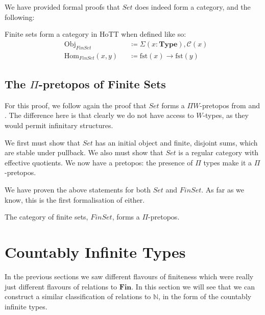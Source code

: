 We have provided formal proofs that \(\mathit{Set}\) does indeed form a
category, and the following:
\begin{theorem}
  Finite sets form a category in HoTT when defined like so:
  \begin{equation}
    \begin{aligned}
      &\text{Obj}_\mathit{FinSet}      &&\coloneqq \Sigma(x : \mathbf{Type}) , \mathcal{C}(x) \\
      &\text{Hom}_\mathit{FinSet}(x , y) &&\coloneqq  \text{fst}(x) \rightarrow \text{fst}(y)
    \end{aligned}
  \end{equation}
\end{theorem}
\subsection{The \(\Pi\)-pretopos of Finite Sets}
For this proof, we follow again the proof that \(\mathit{Set}\) forms a \(\Pi
W\)-pretopos from \cite[chapter 10]{hottbook} and
\cite{rijkeSetsHomotopyType2015}.
The difference here is that clearly we do not have access to \(W\)-types, as
they would permit infinitary structures.

We first must show that \(\mathit{Set}\) has an initial object and finite,
disjoint sums, which are stable under pullback.
We also must show that \(\mathit{Set}\) is a regular category with effective
quotients.
We now have a pretopos: the presence of \(\Pi\) types make it a
\(\Pi\)-pretopos.

We have proven the above statements for both \(\mathit{Set}\) and
\(\mathit{FinSet}\).
As far as we know, this is the first formalisation of either.
\begin{theorem} \label{finite-topos}
  The category of finite sets, \(\mathit{FinSet}\), forms a \(\Pi\)-pretopos.
\end{theorem}
\section{Countably Infinite Types} \label{infinite}
In the previous sections we saw different flavours of finiteness which were
really just different flavours of relations to \(\mathbf{Fin}\).
In this section we will see that we can construct a similar classification of
relations to \(\mathbb{N}\), in the form of the countably infinite types.
